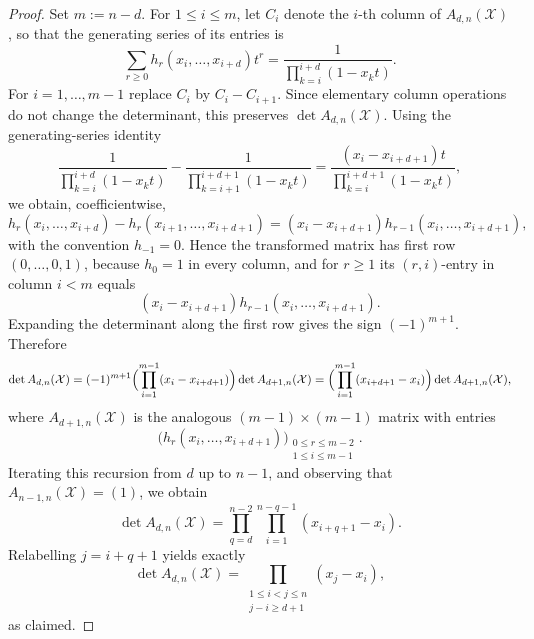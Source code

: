 \documentclass[10pt,a4paper]{amsart}
\newcommand{\cX}{\mathcal{X}}
\begin{document}
\begin{proof}
Set $m:=n-d$. For $1\le i\le m$, let $C_i$ denote the $i$-th column of $A_{d,n}(\cX)$, so that the generating series of its entries is
\[
\sum_{r\ge 0} h_r(x_i,\dots,x_{i+d})t^r
=
\frac{1}{\prod_{k=i}^{i+d}(1-x_kt)}.
\]
For $i=1,\dots,m-1$ replace $C_i$ by $C_i-C_{i+1}$. Since elementary column operations do not change the determinant, this preserves $\det A_{d,n}(\cX)$. Using the generating-series identity
\[
\frac{1}{\prod_{k=i}^{i+d}(1-x_kt)}-\frac{1}{\prod_{k=i+1}^{i+d+1}(1-x_kt)}
=
\frac{(x_i-x_{i+d+1})t}{\prod_{k=i}^{i+d+1}(1-x_kt)},
\]
we obtain, coefficientwise,
\[
 h_r(x_i,\dots,x_{i+d})-h_r(x_{i+1},\dots,x_{i+d+1})
 =(x_i-x_{i+d+1})h_{r-1}(x_i,\dots,x_{i+d+1}),
\]
with the convention $h_{-1}=0$.
Hence the transformed matrix has first row $(0,\dots,0,1)$, because $h_0=1$ in every column, and for $r\ge 1$ its $(r,i)$-entry in column $i<m$ equals
\[
(x_i-x_{i+d+1})h_{r-1}(x_i,\dots,x_{i+d+1}).
\]
Expanding the determinant along the first row gives the sign $(-1)^{m+1}$.  Therefore
\[
\det A_{d,n}(\cX)
=
(-1)^{m+1}\Bigl(\prod_{i=1}^{m-1}(x_i-x_{i+d+1})\Bigr)
\det A_{d+1,n}(\cX)
=
\Bigl(\prod_{i=1}^{m-1}(x_{i+d+1}-x_i)\Bigr)
\det A_{d+1,n}(\cX),
\]
where $A_{d+1,n}(\cX)$ is the analogous $(m-1)\times(m-1)$ matrix with entries
\[
\bigl(h_r(x_i,\dots,x_{i+d+1})\bigr)_{\substack{0\le r\le m-2\\ 1\le i\le m-1}}.
\]
Iterating this recursion from $d$ up to $n-1$, and observing that $A_{n-1,n}(\cX)=(1)$, we obtain
\[
\det A_{d,n}(\cX)
=
\prod_{q=d}^{n-2}\prod_{i=1}^{n-q-1}(x_{i+q+1}-x_i).
\]
Relabelling $j=i+q+1$ yields exactly
\[
\det A_{d,n}(\cX)
=
\prod_{\substack{1\le i<j\le n\\ j-i\ge d+1}} (x_j-x_i),
\]
as claimed.
\end{proof}
\end{document}
